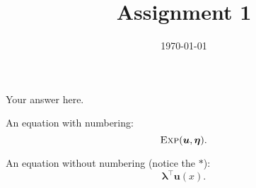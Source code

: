 \documentclass[a4paper]{article}
\date{\today}
\title{Assignment 1}
\newcommand{\T}{\top}
\newcommand{\expdist}[2]{%
        \normalfont{\textsc{Exp}}(#1, #2)%
    }
\newcommand{\expparam}{\bm \lambda}
\newcommand{\natparam}{\bm \eta}
\newcommand{\sufstat}{\bm u}
\begin{document}
    \header{}

    \begin{answer}[Question 1.1]
        Your answer here.

        An equation with numbering:
        \begin{equation}
            \expdist{\sufstat}{\natparam}.
        \end{equation}

        An equation without numbering (notice the $*$):
        \begin{equation*}
            \expparam^{\T} \sufstat(x).
        \end{equation*}
    \end{answer}
\end{document}
